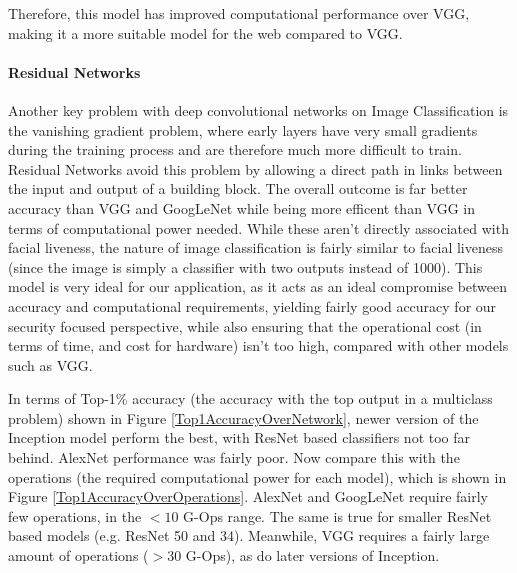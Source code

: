 \documentclass[11pt,a4paper]{article}
\begin{document}
        Therefore, this model has improved computational performance over VGG, making it a more suitable model for the web compared to VGG. \cite{DeepNeuralNetworkDeployability}
        
        \paragraph{Residual Networks}
        Another key problem with deep convolutional networks on Image Classification is the vanishing gradient problem, where early layers have very small gradients during the training process and
        are therefore much more difficult to train. Residual Networks avoid this problem by allowing a direct path in links between the input and output of a building block.
        The overall outcome is far better accuracy than VGG and GoogLeNet while being more efficent than VGG in terms of computational power needed. \cite{DeepResidualNetworks}
        While these aren't directly associated with facial liveness, the nature of image classification is fairly similar to facial liveness (since the image is simply a classifier with two outputs instead of 1000).
        This model is very ideal for our application, as it acts as an ideal compromise between accuracy and computational requirements, yielding fairly good accuracy for our security focused perspective, while also
        ensuring that the operational cost (in terms of time, and cost for hardware) isn't too high, compared with other models such as VGG.

        In terms of Top-1\% accuracy (the accuracy with the top output in a multiclass problem) shown in Figure \ref{Top1AccuracyOverNetwork}, newer version of the Inception model perform the best,
        with ResNet based classifiers not too far behind. AlexNet performance was fairly poor. Now compare this with the operations (the required computational power for each model), which is shown in Figure \ref{Top1AccuracyOverOperations}.
        AlexNet and GoogLeNet require fairly few operations, in the $<10$ G-Ops range. The same is true for smaller ResNet based models (e.g. ResNet 50 and 34).
        Meanwhile, VGG requires a fairly large amount of operations ($>30$ G-Ops), as do later versions of Inception.
\end{document}
